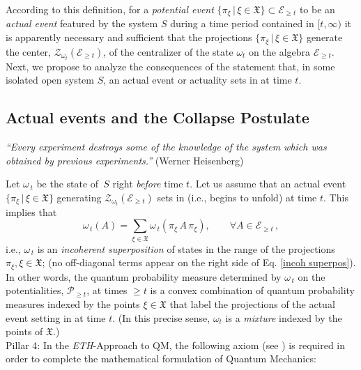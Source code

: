 \documentclass[12pt]{article}
\begin{document}
According to this definition, for a \textit{potential event}
$\big\{\pi_{\xi}\,\vert\, \xi \in \mathfrak{X}\big\}\subset \mathcal{E}_{\geq t}$ to be an
\textit{actual event} featured by the system $S$ during a time period contained in $[t, \infty)$ it is apparently necessary
and sufficient that the projections $\big\{\pi_{\xi}\,\vert\, \xi \in \mathfrak{X}\big\}$ generate the center,
$\mathcal{Z}_{\omega_t}(\mathcal{E}_{\geq t})$, of the centralizer of the state $\omega_t$ on the algebra
$\mathcal{E}_{\geq t}$.\\

Next, we propose to analyze the consequences of the statement that, in some isolated open system $S$,
an actual event or actuality sets in at time $t$.

\subsection{Actual events and the Collapse Postulate}

\hspace{0.5cm}\textit{``Every experiment destroys some of the knowledge of the system which was obtained by previous experiments.''} (Werner Heisenberg)

Let $\omega_{\,t}$ be the state of~$S$ right \textit{before} time $t$. Let us assume that an actual event
 $\big\{ \pi_{\xi} \,|\, \xi \in \mathfrak{X} \big\}$ generating $\mathcal{Z}_{\omega_t}(\mathcal{E}_{\geq t})$ sets in (i.e., begins to unfold) at time $t$. This implies that
 \begin{equation}\label{incoh superpos}
 \omega_{\,t}(A)= \sum_{\xi \in \mathfrak{X}} \omega_{\,t}(\pi_{\xi} \,A\, \pi_{\xi}), \qquad \forall A \in \mathcal{E}_{\geq t}\,,
 \end{equation}
 i.e., $\omega_{\,t}$ is an \textit{incoherent superposition} of states in the range of the projections
 $\pi_{\xi}, \xi \in \mathfrak{X}$; (no off-diagonal terms appear on the right side of Eq. \eqref{incoh superpos}). In other words, the quantum probability measure determined by $\omega_{\,t}$ on the potentialities, $\mathcal{P}_{\geq t}$, at times $\geq t$ is a convex combination of quantum probability measures indexed by the points $\xi \in \mathfrak{X}$ that label the projections of the actual event setting in at time $t$. (In this precise sense, $\omega_t$ is a \textit{mixture} indexed by the points of $\mathfrak{X}$.)\\

{Pillar 4}:  In the \textit{ETH}-Approach to QM, the following axiom (see \cite{Fr1}) is required in order to complete the mathematical formulation of Quantum Mechanics:
\end{document}

